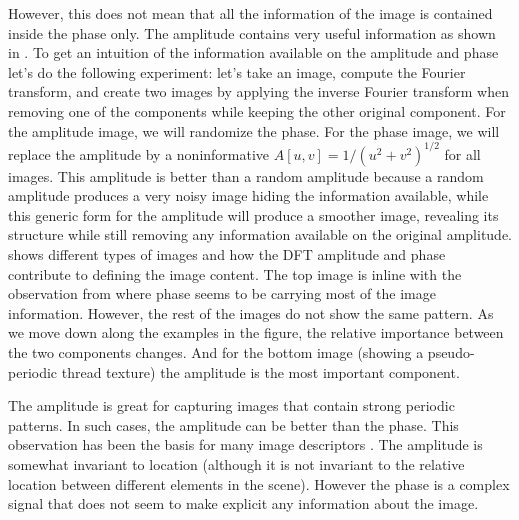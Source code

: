 However, this does not mean that all the information of the image is contained inside the phase only. The amplitude contains very useful information as shown in \fig{\ref{fig:phasevsamp}}. To get an intuition of the information available on the amplitude and phase let's do the following experiment: let's take an image, compute the Fourier transform, and create two images by applying the inverse Fourier transform when removing one of the components while keeping the other original component. For the amplitude image, we will randomize the phase. For the phase image, we will replace the amplitude by a noninformative $A \left[u,v \right] = 1/(u^2+v^2)^{1/2}$ for all images. This amplitude is better than a random amplitude because a random amplitude produces a very noisy image hiding the information available, while this generic form for the amplitude will produce a smoother image, revealing its structure while still removing any information available on the original amplitude. \Fig{\ref{fig:phasevsamp}} shows different types of images and how the DFT amplitude and phase contribute to defining the image content. The top image is inline with the observation from \fig{\ref{fig:phaseoramp}} where phase seems to be carrying most of the image information. However, the rest of the images do not show the same pattern. As we move down along the examples in the figure, the relative importance between the two components changes. And for the bottom image (showing a pseudo-periodic thread texture) the amplitude is the most important component.


The amplitude is great for capturing images that contain strong periodic patterns. In such cases, the amplitude can be better than the phase. This observation has been the basis for many image descriptors \cite{Gorkani94,oliva01}. The amplitude is somewhat invariant to location (although it is not invariant to the relative location between different elements in the scene). However the phase is a complex signal that does not seem to make explicit any information about the image.


%
%
%
%



